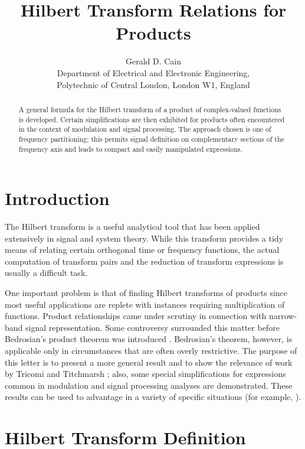 \documentclass[12pt]{article}
\title{Hilbert Transform Relations for Products}
\author{Gerald D. Cain\\
Department of Electrical and Electronic Engineering,\\
Polytechnic of Central London, London W1, England}
\date{}
\begin{document}
\maketitle

\begin{abstract}
A general formula for the Hilbert transform of a product of complex-valued functions is developed. Certain simplifications are then exhibited for products often encountered in the context of modulation and signal processing. The approach chosen is one of frequency partitioning; this permits signal definition on complementary sections of the frequency axis and leads to compact and easily manipulated expressions.
\end{abstract}

\section{Introduction}

The Hilbert transform is a useful analytical tool that has been applied extensively in signal and system theory. While this transform provides a tidy means of relating certain orthogonal time or frequency functions, the actual computation of transform pairs and the reduction of transform expressions is usually a difficult task.

One important problem is that of finding Hilbert transforms of products since most useful applications are replete with instances requiring multiplication of functions. Product relationships came under scrutiny in connection with narrow-band signal representation. Some controversy \cite{Lerner1960, Kelly1960, Urkowitz1962, Bedrosian1963, Rihaczek1966, Rubin1966, Nuttall1966} surrounded this matter before Bedrosian’s product theorem was introduced \cite{Bedrosian1963, Nuttall1966}. Bedrosian’s theorem, however, is applicable only in circumstances that are often overly restrictive. The purpose of this letter is to present a more general result and to show the relevance of work by Tricomi \cite{Tricomi1951} and Titchmarsh \cite{Titchmarsh1937}; also, some special simplifications for expressions common in modulation and signal processing analyses are demonstrated. These results can be used to advantage in a variety of specific situations (for example, \cite{Cain1965}).

\section{Hilbert Transform Definition}
\end{document}
